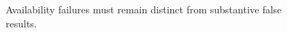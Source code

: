 \begin{figure}[H]
\centering
{}
\caption{Availability failures must remain distinct from substantive false results.}\label{fig:teach-M10-09}
\end{figure}
